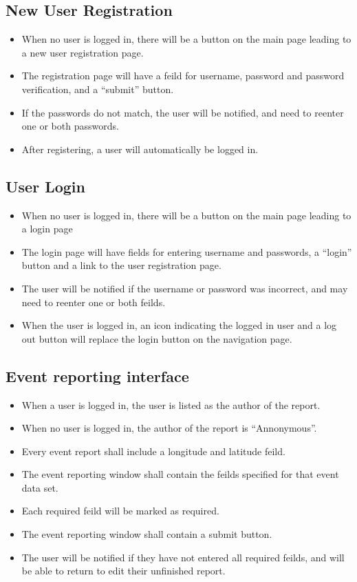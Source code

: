 \subsection{New User Registration}
\begin{itemize}
\item When no user is logged in, there will be a button on the main page leading to a new user registration page.
\item The registration page will have a feild for username, password and password verification, and a ``submit'' button.
\item If the passwords do not match, the user will be notified, and need to reenter one or both passwords.
\item After registering, a user will automatically be logged in.
\end{itemize}

\subsection{User Login}
\begin{itemize}
\item When no user is logged in, there will be a button on the main page leading to a login page
\item The login page will have fields for entering username and passwords, a ``login'' button and a link to the user registration page.
\item The user will be notified if the username or password was incorrect, and may need to reenter one or both feilds.
\item When the user is logged in, an icon indicating the logged in user and a log out button will replace the login button on the navigation page.
\end{itemize}

\subsection{Event reporting interface}
\begin{itemize}
\item When a user is logged in, the user is listed as the author of the report.
\item When no user is logged in, the author of the report is ``Annonymous''.
\item Every event report shall include a longitude and latitude feild.
\item The event reporting window shall contain the feilds specified for that event data set.
\item Each required feild will be marked as required.
\item The event reporting window shall contain a submit button.
\item The user will be notified if they have not entered all required feilds, and will be able to return to edit their unfinished report.
\end{itemize}

